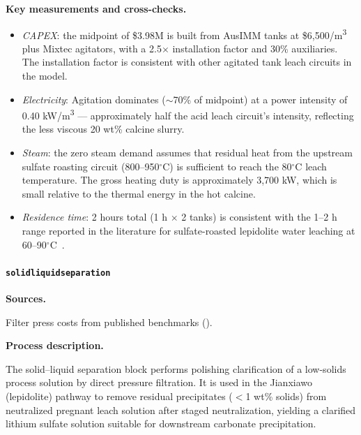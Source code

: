 \documentclass{article}
\renewcommand\_{\textunderscore\allowbreak}
\begin{document}
\medskip
\noindent\textbf{Key measurements and cross-checks.}\quad

\begin{itemize}[noitemsep]
	\item \textit{CAPEX}: the midpoint of \$3.98M is built from AusIMM tanks at \$6,500/\si{m^3} plus Mixtec agitators, with a 2.5$\times$ installation factor and 30\% auxiliaries. The installation factor is consistent with other agitated tank leach circuits in the model. 
	\item \textit{Electricity}: Agitation dominates ($\sim$70\% of midpoint) at a power intensity of 0.40 \si{kW/m^3} --- approximately half the acid leach circuit's intensity, reflecting the less viscous 20 wt\% calcine slurry.
	\item \textit{Steam}: the zero steam demand assumes that residual heat from the upstream sulfate roasting circuit (800--950$^\circ$C) is sufficient to reach the 80$^\circ$C leach temperature. The gross heating duty is approximately 3,700 kW, which is small relative to the thermal energy in the hot calcine.
	\item \textit{Residence time}: 2 hours total (1 h $\times$ 2 tanks) is consistent with the 1--2 h range reported in the literature for sulfate-roasted lepidolite water leaching at 60--90$^\circ$C~\citep{yanExtractionLithiumLepidolite2012, dengSystematicReviewSulfate2026}.
\end{itemize}

\clearpage
\paragraph{\texttt{solid\_liquid\_separation}}\label{app:04-methods-blockdefs-sls}\leavevmode\par

\medskip
\noindent\textbf{Sources.}\quad

Filter press costs from published benchmarks (\citet{porvooIndustrialFilterPress2025}). 

\medskip
\noindent\textbf{Process description.}\quad

The solid--liquid separation block performs polishing clarification of a low-solids process solution by direct pressure filtration. It is used in the Jianxiawo (lepidolite) pathway to remove residual precipitates ($<$1 wt\% solids) from neutralized pregnant leach solution after staged neutralization, yielding a clarified lithium sulfate solution suitable for downstream carbonate precipitation.
\end{document}
